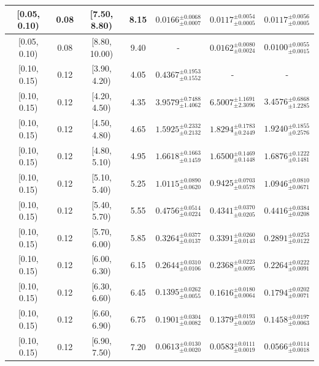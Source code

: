\begin{longtable}{|c|c|c|c|c|c|c|}
\hline
[0.05, 0.10) & 0.08 & [7.50, 8.80) & 8.15 & $0.0166^{ \pm 0.0068 }_{ \pm 0.0007 }$ & $0.0117^{ \pm 0.0054 }_{ \pm 0.0005 }$ & $0.0117^{ \pm 0.0056 }_{ \pm 0.0005 }$ \\ 
\hline
[0.05, 0.10) & 0.08 & [8.80, 10.00) & 9.40 & - & $0.0162^{ \pm 0.0080 }_{ \pm 0.0024 }$ & $0.0100^{ \pm 0.0055 }_{ \pm 0.0015 }$ \\ 
\hline
[0.10, 0.15) & 0.12 & [3.90, 4.20) & 4.05 & $0.4367^{ \pm 0.1953 }_{ \pm 0.1552 }$ & - & - \\ 
\hline
[0.10, 0.15) & 0.12 & [4.20, 4.50) & 4.35 & $3.9579^{ \pm 0.7488 }_{ \pm 1.4062 }$ & $6.5007^{ \pm 1.1691 }_{ \pm 2.3096 }$ & $3.4576^{ \pm 0.6868 }_{ \pm 1.2285 }$ \\ 
\hline
[0.10, 0.15) & 0.12 & [4.50, 4.80) & 4.65 & $1.5925^{ \pm 0.2332 }_{ \pm 0.2132 }$ & $1.8294^{ \pm 0.1783 }_{ \pm 0.2449 }$ & $1.9240^{ \pm 0.1855 }_{ \pm 0.2576 }$ \\ 
\hline
[0.10, 0.15) & 0.12 & [4.80, 5.10) & 4.95 & $1.6618^{ \pm 0.1663 }_{ \pm 0.1459 }$ & $1.6500^{ \pm 0.1469 }_{ \pm 0.1448 }$ & $1.6876^{ \pm 0.1222 }_{ \pm 0.1481 }$ \\ 
\hline
[0.10, 0.15) & 0.12 & [5.10, 5.40) & 5.25 & $1.0115^{ \pm 0.0890 }_{ \pm 0.0620 }$ & $0.9425^{ \pm 0.0703 }_{ \pm 0.0578 }$ & $1.0946^{ \pm 0.0810 }_{ \pm 0.0671 }$ \\ 
\hline
[0.10, 0.15) & 0.12 & [5.40, 5.70) & 5.55 & $0.4756^{ \pm 0.0514 }_{ \pm 0.0224 }$ & $0.4341^{ \pm 0.0370 }_{ \pm 0.0205 }$ & $0.4416^{ \pm 0.0384 }_{ \pm 0.0208 }$ \\ 
\hline
[0.10, 0.15) & 0.12 & [5.70, 6.00) & 5.85 & $0.3264^{ \pm 0.0377 }_{ \pm 0.0137 }$ & $0.3391^{ \pm 0.0260 }_{ \pm 0.0143 }$ & $0.2891^{ \pm 0.0253 }_{ \pm 0.0122 }$ \\ 
\hline
[0.10, 0.15) & 0.12 & [6.00, 6.30) & 6.15 & $0.2644^{ \pm 0.0310 }_{ \pm 0.0106 }$ & $0.2368^{ \pm 0.0223 }_{ \pm 0.0095 }$ & $0.2264^{ \pm 0.0222 }_{ \pm 0.0091 }$ \\ 
\hline
[0.10, 0.15) & 0.12 & [6.30, 6.60) & 6.45 & $0.1395^{ \pm 0.0262 }_{ \pm 0.0055 }$ & $0.1616^{ \pm 0.0180 }_{ \pm 0.0064 }$ & $0.1794^{ \pm 0.0202 }_{ \pm 0.0071 }$ \\ 
\hline
[0.10, 0.15) & 0.12 & [6.60, 6.90) & 6.75 & $0.1901^{ \pm 0.0304 }_{ \pm 0.0082 }$ & $0.1379^{ \pm 0.0193 }_{ \pm 0.0059 }$ & $0.1458^{ \pm 0.0197 }_{ \pm 0.0063 }$ \\ 
\hline
[0.10, 0.15) & 0.12 & [6.90, 7.50) & 7.20 & $0.0613^{ \pm 0.0130 }_{ \pm 0.0020 }$ & $0.0583^{ \pm 0.0111 }_{ \pm 0.0019 }$ & $0.0566^{ \pm 0.0114 }_{ \pm 0.0018 }$ \\ 

\end{longtable}
